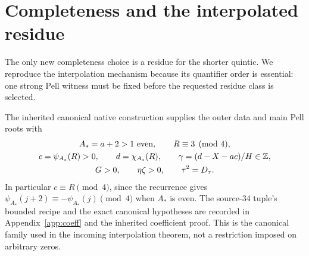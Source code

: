 \section{Completeness and the interpolated residue}\label{sec:completeness}

The only new completeness choice is a residue for the shorter quintic.
We reproduce the interpolation mechanism because its quantifier order
is essential: one strong Pell witness must be fixed before the requested
residue class is selected.

The inherited canonical native construction supplies the outer data and
main Pell roots with
\begin{equation}\label{eq:canonical}
 \begin{gathered}
 A_*=a+2>1\text{ even},\qquad R\equiv3\pmod4,\\
 c=\psi_{A_*}(R)>0,\qquad d=\chi_{A_*}(R),\qquad
 \gamma=(d-X-ac)/H\in\mathbb Z,\\
 G>0,\qquad\eta\zeta>0,\qquad \tau^2=D_{\tau}.
 \end{gathered}
\end{equation}
In particular $c\equiv R\pmod4$, since the recurrence gives
$\psi_{A_*}(j+2)\equiv-\psi_{A_*}(j)\pmod4$ when $A_*$ is even.
The source-34 tuple's bounded recipe and the exact canonical hypotheses
are recorded in Appendix~\ref{app:coeff} and the inherited coefficient
proof. This is the canonical family used in the incoming interpolation
theorem, not a restriction imposed on arbitrary zeros.

